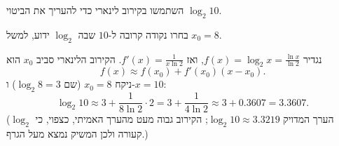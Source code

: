 
\begin{question}
השתמשו בקירוב לינארי כדי להעריך את הביטוי $\log_2 10$.
\end{question}

\begin{hint}
בחרו נקודה קרובה ל-$10$ שבה $\log_2$ ידוע, למשל $x_0=8$.
\end{hint}

\begin{solution}
נגדיר $f(x)=\log_2 x=\frac{\ln x}{\ln 2}$, ואז $f'(x)=\frac{1}{x\ln 2}$. הקירוב הלינארי סביב $x_0$ הוא
\[ f(x)\approx f(x_0)+f'(x_0)(x-x_0). \]
ניקח $x_0=8$ (שם $\log_2 8=3$) ו-$x=10$:
\[ \log_2 10\approx 3+\frac{1}{8\ln 2}\cdot 2=3+\frac{1}{4\ln 2}\approx 3+0.3607=\boxed{3.3607}. \]
(הערך המדויק $\log_2 10\approx 3.3219$; הקירוב גבוה מעט מהערך האמיתי, כצפוי, כי $\log_2$ קעורה ולכן המשיק נמצא מעל הגרף.)
\end{solution}
